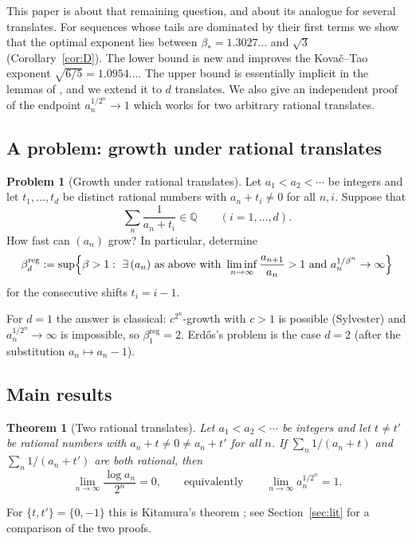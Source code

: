 \documentclass[11pt]{amsart}
\newtheorem{theorem}{Theorem}
\theoremstyle{definition}
\newtheorem{problem}[lemma]{Problem}
\theoremstyle{remark}
\newcommand{\Q}{\mathbb{Q}}
\begin{document}
This paper is about that remaining question, and about its analogue for several
translates. For sequences whose tails are dominated by their first terms we show that
the optimal exponent lies between $\beta_*=1.3027\ldots$ and $\sqrt3$
(Corollary~\ref{cor:D}). The lower bound is new and improves the Kova\v{c}--Tao exponent
$\sqrt{6/5}=1.0954\ldots$. The upper bound is essentially implicit in the lemmas of
\cite{Kit26}, and we extend it to $d$ translates. We also give an independent proof of the endpoint
$a_n^{1/2^n}\to1$ which works for two arbitrary rational translates.

\subsection{A problem: growth under rational translates}

\begin{problem}[Growth under rational translates]\label{prob:shifts}
Let $a_1<a_2<\cdots$ be integers and let $t_1,\dots,t_d$ be distinct rational numbers
with $a_n+t_i\ne0$ for all $n,i$. Suppose that
\[
\sum_n\frac{1}{a_n+t_i}\in\Q\qquad(i=1,\dots,d).
\]
How fast can $(a_n)$ grow? In particular, determine
\[
\beta_d^{\mathrm{reg}}:=\sup\Bigl\{\beta>1:\ \exists\,(a_n)\ \text{as above with}\
\liminf_{n\to\infty}\frac{a_{n+1}}{a_n}>1\ \text{and}\ a_n^{1/\beta^n}\to\infty\Bigr\}
\]
for the consecutive shifts $t_i=i-1$.
\end{problem}

For $d=1$ the answer is classical: $c^{2^n}$-growth with $c>1$ is possible (Sylvester)
and $a_n^{1/2^n}\to\infty$ is impossible, so $\beta_1^{\mathrm{reg}}=2$. Erd\H{o}s's
problem is the case $d=2$ (after the substitution $a_n\mapsto a_n-1$).

\subsection{Main results}

\begin{theorem}[Two rational translates]\label{thm:A}
Let $a_1<a_2<\cdots$ be integers and let $t\ne t'$ be rational numbers with
$a_n+t\ne 0\ne a_n+t'$ for all $n$. If $\sum_n 1/(a_n+t)$ and $\sum_n 1/(a_n+t')$ are
both rational, then
\[
\lim_{n\to\infty}\frac{\log a_n}{2^n}=0,\qquad\text{equivalently}\qquad
\lim_{n\to\infty}a_n^{1/2^n}=1 .
\]
\end{theorem}

For $\{t,t'\}=\{0,-1\}$ this is Kitamura's theorem \cite{Kit26}; see
Section~\ref{sec:lit} for a comparison of the two proofs.
\end{document}
